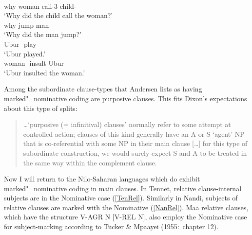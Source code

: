 \begin{exe}\ex\label{ParMN}
\begin{xlist}
\ex\gll {}   \\
why woman call-3\sg{} child-\erg{}\\
\glt`Why did the child call the woman?'
\ex\gll{}  \\
why jump man-\erg{}\\
\glt`Why did the man jump?'
\ex\gll{} \\
Ubur \compl{}-play\\
\glt `Ubur played.'
\ex\gll{}  \\
woman \compl{}-insult Ubur-\erg{}\\
\glt `Ubur insulted the woman.'
\end{xlist}
\end{exe} %

Among the subordinate clause-types that Andersen lists as having marked"=nominative coding are purposive clauses.  
This fits Dixon's expectations about this type of splits:

\begin{quote}
\dots `purposive (= infinitival) clauses' normally refer to some attempt at controlled action; clauses of this kind generally have an A or S `agent' NP that is co-referential with some NP in their main clause [\dots] for this type of subordinate construction, we would surely expect S and A to be treated in the same way within the complement clause. 
\citep[101f.]{Dixon:1994}
\end{quote}

Now I will return to the Nilo-Saharan languages which do exhibit marked"=nominative coding in main clauses.
In Tennet, relative clause-internal subjects are in the Nominative  case (\ref{TenRel}).
Similarly in Nandi, subjects of relative clauses are marked with the Nominative  (\ref{NanRel}).
Maa relative clauses, which have the structure V-AGR N [V-REL N], also employ the Nominative  case for subject-marking according to Tucker \& Mpaayei (1955:~chapter 12).%

